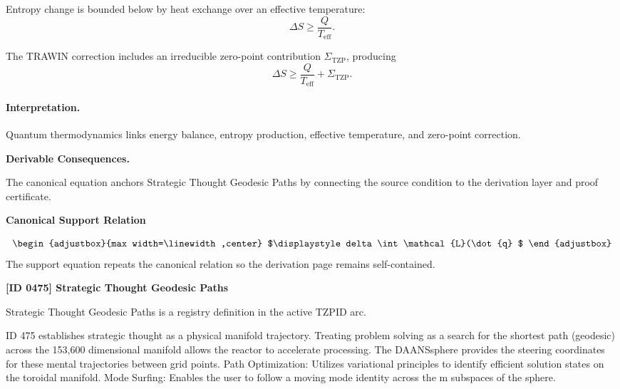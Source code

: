 Entropy change is bounded below by heat exchange over an effective temperature:
\begin{equation}
\Delta S\geq \frac{Q}{T_{\mathrm{eff}}}.
\end{equation}

The TRAWIN correction includes an irreducible zero-point contribution $\Sigma_{\mathrm{TZP}}$, producing
\begin{equation}
\boxed{
\Delta S
\geq
\frac{Q}{T_{\mathrm{eff}}}
+
\Sigma_{\mathrm{TZP}} .
}
\end{equation}

\paragraph{Interpretation.}
Quantum thermodynamics links energy balance, entropy production, effective temperature, and zero-point correction.

\par\vspace{0.35em}
\noindent\textbf{Derivable Consequences.}\quad
\begingroup
\footnotesize
\raggedright
The canonical equation anchors Strategic Thought Geodesic Paths by connecting the source condition to the derivation layer and proof certificate.
\par\endgroup

\noindent\textbf{Canonical Support Relation}\par
\[
\begin{adjustbox}{max width=\linewidth,center}
$\displaystyle
delta \int \mathcal{L}(\dot{q}
$
\end{adjustbox}
\]
\noindent The support equation repeats the canonical relation so the derivation page remains self-contained.\par

\clearpage
\noindent\textbf{[ID 0475] Strategic Thought Geodesic Paths}\par
\vspace{0.35em}
\begingroup\small
{}
Strategic Thought Geodesic Paths is a registry definition in the active TZPID arc.

ID 475 establishes strategic thought as a physical manifold trajectory. Treating problem solving as a search for the shortest path (geodesic) across the 153,600 dimensional manifold allows the reactor to accelerate processing. The DAANSsphere provides the steering coordinates for these mental trajectories between grid points. Path Optimization: Utilizes variational principles to identify efficient solution states on the toroidal manifold. Mode Surfing: Enables the user to follow a moving mode identity across the m subspaces of the sphere.


